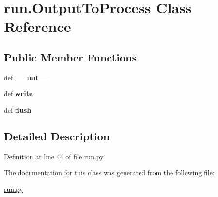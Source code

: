 \hypertarget{classrun_1_1_output_to_process}{
\section{run.OutputToProcess Class Reference}
\label{classrun_1_1_output_to_process}
}
\subsection*{Public Member Functions}
\begin{DoxyCompactItemize}
\item 
\hypertarget{classrun_1_1_output_to_process_a937ecd7365626754b6798a6e8839f99d}{
def {\bfseries \_\-\_\-init\_\-\_\-}}
\label{classrun_1_1_output_to_process_a937ecd7365626754b6798a6e8839f99d}

\item 
\hypertarget{classrun_1_1_output_to_process_a9740a62e197ca9807248f82bde373fd6}{
def {\bfseries write}}
\label{classrun_1_1_output_to_process_a9740a62e197ca9807248f82bde373fd6}

\item 
\hypertarget{classrun_1_1_output_to_process_a83d9e1805fb6d3d173ba68ee69329834}{
def {\bfseries flush}}
\label{classrun_1_1_output_to_process_a83d9e1805fb6d3d173ba68ee69329834}

\end{DoxyCompactItemize}


\subsection{Detailed Description}


Definition at line 44 of file run.py.



The documentation for this class was generated from the following file:\begin{DoxyCompactItemize}
\item 
\hyperlink{run_8py}{run.py}\end{DoxyCompactItemize}

